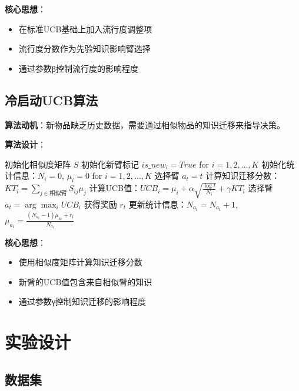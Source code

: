 \documentclass[12pt,a4paper]{article}
\begin{document}
\textbf{核心思想}：
\begin{itemize}
    \item 在标准UCB基础上加入流行度调整项
    \item 流行度分数作为先验知识影响臂选择
    \item 通过参数β控制流行度的影响程度
\end{itemize}

\subsection{冷启动UCB算法}

\textbf{算法动机}：新物品缺乏历史数据，需要通过相似物品的知识迁移来指导决策。

\textbf{算法设计}：
\begin{algorithm}
\caption{冷启动UCB算法}
\begin{algorithmic}[1]
\STATE 初始化相似度矩阵 $S$
\STATE 初始化新臂标记 $is\_new_i = True$ for $i = 1, 2, \ldots, K$
\STATE 初始化统计信息：$N_i = 0$, $\mu_i = 0$ for $i = 1, 2, \ldots, K$
        \STATE 选择臂 $a_t = t$
    \ELSE
            \STATE 计算知识迁移分数：$KT_i = \sum_{j \in \text{相似臂}} S_{ij} \mu_j$
        \ENDFOR
        \STATE 计算UCB值：$UCB_i = \mu_i + \alpha \sqrt{\frac{\log t}{N_i}} + \gamma KT_i$
        \STATE 选择臂 $a_t = \arg\max_{i} UCB_i$
    \ENDIF
    \STATE 获得奖励 $r_t$
    \STATE 更新统计信息：$N_{a_t} = N_{a_t} + 1$, $\mu_{a_t} = \frac{(N_{a_t}-1)\mu_{a_t} + r_t}{N_{a_t}}$
\ENDFOR
\end{algorithmic}
\end{algorithm}

\textbf{核心思想}：
\begin{itemize}
    \item 使用相似度矩阵计算知识迁移分数
    \item 新臂的UCB值包含来自相似臂的知识
    \item 通过参数γ控制知识迁移的影响程度
\end{itemize}

\section{实验设计}

\subsection{数据集}
\end{document}
